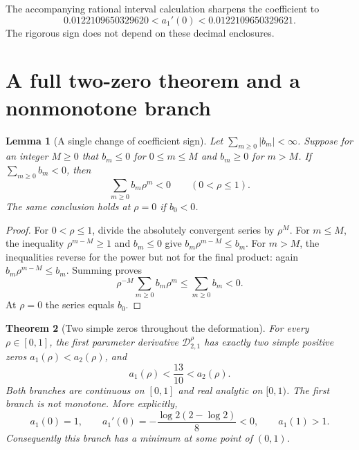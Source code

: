 \documentclass[11pt,a4paper]{article}
\newtheorem{theorem}{Theorem}[section]
\newtheorem{lemma}[theorem]{Lemma}
\theoremstyle{definition}
\theoremstyle{remark}
\numberwithin{equation}{section}
\begin{document}
The accompanying rational interval calculation sharpens the coefficient
to
\[
 0.0122109650329620<a_1'(0)<0.0122109650329621.
\]
The rigorous sign does not depend on these decimal enclosures.

\section{A full two-zero theorem and a nonmonotone branch}
\label{lerchboundary:sec:n2}

\begin{lemma}[A single change of coefficient sign]
\label{lerchboundary:lem:coefficient-sign}
Let $\sum_{m\geq0}|b_m|<\infty$. Suppose for an integer $M\geq0$ that
$b_m\leq0$ for $0\leq m\leq M$ and $b_m\geq0$ for $m>M$.
If $\sum_{m\geq0}b_m<0$, then
\[
 \sum_{m\geq0}b_m\rho^m<0\qquad(0<\rho\leq1).
\]
The same conclusion holds at $\rho=0$ if $b_0<0$.
\end{lemma}

\begin{proof}
For $0<\rho\leq1$, divide the absolutely convergent series by $\rho^M$.
For $m\leq M$, the inequality $\rho^{m-M}\geq1$ and $b_m\leq0$ give
$b_m\rho^{m-M}\leq b_m$. For $m>M$, the inequalities reverse for the
power but not for the final product: again
$b_m\rho^{m-M}\leq b_m$. Summing proves
\[
 \rho^{-M}\sum_{m\geq0}b_m\rho^m\leq\sum_{m\geq0}b_m<0.
\]
At $\rho=0$ the series equals $b_0$.
\end{proof}

\begin{theorem}[Two simple zeros throughout the deformation]
\label{lerchboundary:thm:n2global}
For every $\rho\in[0,1]$, the first parameter derivative
$\mathcal D_{2,1}^{\rho}$ has exactly two simple positive zeros
$a_1(\rho)<a_2(\rho)$, and
\begin{equation}\label{lerchboundary:eq:n2bracket}
 a_1(\rho)<\frac{13}{10}<a_2(\rho).
\end{equation}
Both branches are continuous on $[0,1]$ and real analytic on $[0,1)$.
The first branch is not monotone. More explicitly,
\begin{equation}\label{lerchboundary:eq:n2derivative}
 a_1(0)=1,\qquad
 a_1'(0)=-\frac{\log2(2-\log2)}8<0,
 \qquad a_1(1)>1.
\end{equation}
Consequently this branch has a minimum at some point of $(0,1)$.
\end{theorem}
\end{document}
